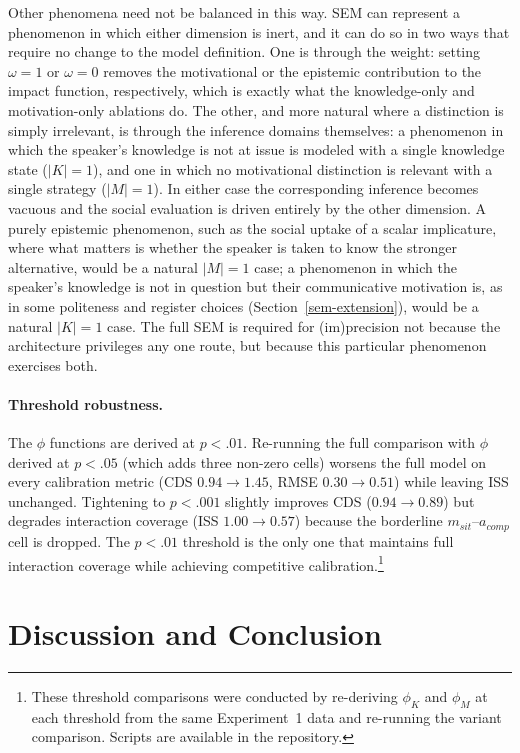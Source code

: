 \documentclass[12pt,a4paper]{article}
\begin{document}
Other phenomena need not be balanced in this way. SEM can represent a phenomenon
in which either dimension is inert, and it can do so in two ways that require no
change to the model definition. One is through the weight: setting $\omega = 1$
or $\omega = 0$ removes the motivational or the epistemic contribution to the
impact function, respectively, which is exactly what the knowledge-only and
motivation-only ablations do. The other, and more natural where a distinction is
simply irrelevant, is through the inference domains themselves: a phenomenon in
which the speaker's knowledge is not at issue is modeled with a single knowledge
state ($|K| = 1$), and one in which no motivational distinction is relevant with a
single strategy ($|M| = 1$). In either case the corresponding inference becomes
vacuous and the social evaluation is driven entirely by the other dimension. A
purely epistemic phenomenon, such as the social uptake of a scalar implicature,
where what matters is whether the speaker is taken to know the stronger
alternative, would be a natural $|M| = 1$ case; a phenomenon in which the
speaker's knowledge is not in question but their communicative motivation is, as
in some politeness and register choices (Section~\ref{sem-extension}), would be a
natural $|K| = 1$ case. The full SEM is required for (im)precision not because the
architecture privileges any one route, but because this particular phenomenon
exercises both.


\paragraph{Threshold robustness.}
The $\phi$ functions are derived at $p < .01$. Re-running the full comparison
with $\phi$ derived at $p < .05$ (which adds three non-zero cells) worsens the
full model on every calibration metric (CDS $0.94 \to 1.45$, RMSE $0.30 \to
0.51$) while leaving ISS unchanged. Tightening to $p < .001$ slightly improves
CDS ($0.94 \to 0.89$) but degrades interaction coverage (ISS $1.00 \to 0.57$)
because the borderline $m_{sit}$--$a_{comp}$ cell is dropped. The $p < .01$
threshold is the only one that maintains full interaction coverage while
achieving competitive calibration.\footnote{These threshold comparisons were
conducted by re-deriving $\phi_K$ and $\phi_M$ at each threshold from the same
Experiment~1 data and re-running the variant comparison. Scripts are available
in the repository.}


\section{Discussion and Conclusion}
\label{sec:conclusion}
\end{document}
